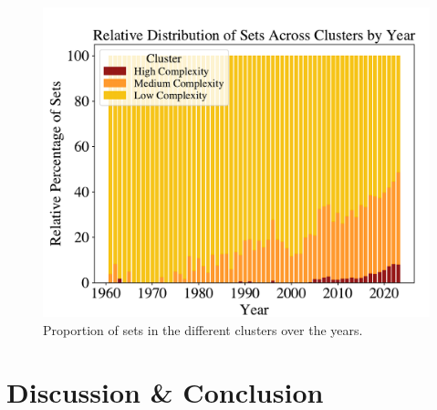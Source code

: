 \documentclass{article}
\theoremstyle{plain}
\theoremstyle{definition}
\theoremstyle{remark}
\begin{document}
\begin{figure}[H]
 \begin{center}
 \centerline{\includegraphics[width=\columnwidth]{../Images/Clusters.pdf}}
\caption{Proportion of sets in the different clusters over the years.}
\label{icml-historical}
 \end{center}
 \vskip -0.2in
\end{figure}

\section{Discussion \& Conclusion}\label{sec:conclusion}
\end{document}

